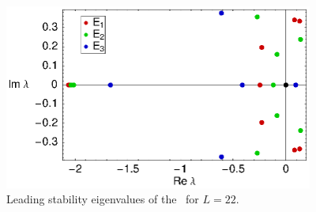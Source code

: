 \begin{figure}[t]
\begin{center}
\includegraphics[width=4in]{figs/L22-eqvaEigenvalues.eps}
\end{center}
\caption{
Leading stability eigenvalues of the \eqva\ for $L=22$.
}
\label{f:KS22EkEigs}
\end{figure}

